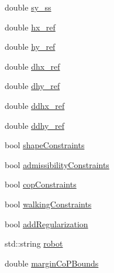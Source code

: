 \begin{DoxyCompactItemize}
\item 
double \hyperlink{structMIQPParameters_a3c473019e93f8191f288edfe6999f4c1}{sy\-\_\-ss}
\item 
double \hyperlink{structMIQPParameters_a0346212871459ae33b79af6f9af49d5f}{hx\-\_\-ref}
\item 
double \hyperlink{structMIQPParameters_a09fe82db83af3f8ab0e891968daa7996}{hy\-\_\-ref}
\item 
double \hyperlink{structMIQPParameters_a97a8deb8aeda727c99dc501b4516a24e}{dhx\-\_\-ref}
\item 
double \hyperlink{structMIQPParameters_a816bb15b6417ac8387adbaac2f74e198}{dhy\-\_\-ref}
\item 
double \hyperlink{structMIQPParameters_a71dab92bc2eebbdf5e2d592c092e7f52}{ddhx\-\_\-ref}
\item 
double \hyperlink{structMIQPParameters_a996553605ecfefa749bde01bc4e7b2a9}{ddhy\-\_\-ref}
\item 
bool \hyperlink{structMIQPParameters_a718ac69205eb5fbb51f58cd59176a3ff}{shape\-Constraints}
\item 
bool \hyperlink{structMIQPParameters_ae8e541722b3e3664ab516676aa1c16be}{admissibility\-Constraints}
\item 
bool \hyperlink{structMIQPParameters_a3a0fd04f9e8767097e44e02a740796bc}{cop\-Constraints}
\item 
bool \hyperlink{structMIQPParameters_af7cbaa08836e17417f9f5c170b55f1bc}{walking\-Constraints}
\item 
bool \hyperlink{structMIQPParameters_a7e5417e18e6797739def8f916c3efc40}{add\-Regularization}
\item 
std\-::string \hyperlink{structMIQPParameters_af2f4673b548e119f30a7e90baac268f5}{robot}
\item 
double \hyperlink{structMIQPParameters_a5befafbd8312ce18fc57bf32ccb6a16c}{margin\-Co\-P\-Bounds}
\end{DoxyCompactItemize}



